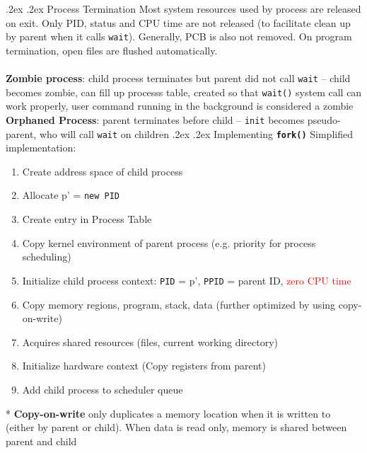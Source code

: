 \documentclass[13pt,landscape,a4paper]{article}
\makeatletter
\renewcommand{\subsection}{\@startsection{subsection}{1}{0mm}%
    {.2ex}%
    {.2ex}%
    {\sffamily\bfseries}}
\makeatother
\begin{document}
\begin{multicols*}{3}
        \subsection{Process Termination}
        Most system resources used by process are released on exit. Only PID, status and CPU time are not released (to facilitate clean up by parent when it calls \texttt{wait}). Generally, PCB is also not removed. On program termination, open files are flushed automatically.\\\\
        \textbf{Zombie process}: child process terminates but parent did not call \texttt{wait} -- child becomes zombie, can fill up processs table, created so that \texttt{wait()} system call can work properly, user command running in the background is considered a zombie\\
        \textbf{Orphaned Process}: parent terminates before child -- \texttt{init} becomes pseudo-parent, who will call \texttt{wait} on children
        \subsection{Implementing \texttt{\textbf{fork()}}}
        Simplified implementation:
        \begin{enumerate}
            \item Create address space of child process
            \item Allocate p' = \texttt{new PID}
            \item Create entry in Process Table
            \item Copy kernel environment of parent process (e.g. priority for process scheduling)
            \item Initialize child process context: \texttt{PID} = p', \texttt{PPID} = parent ID, \textcolor{red}{zero CPU time}
            \item Copy memory regions, program, stack, data (further optimized by using copy-on-write)
            \item Acquires shared resources (files, current working directory)
            \item Initialize hardware context (Copy registers from parent)
            \item Add child process to scheduler queue
        \end{enumerate}
        * \textbf{Copy-on-write} only duplicates a memory location when it is written to (either by parent or child). When data is read only, memory is shared between parent and child

\end{multicols*}
\end{document}
